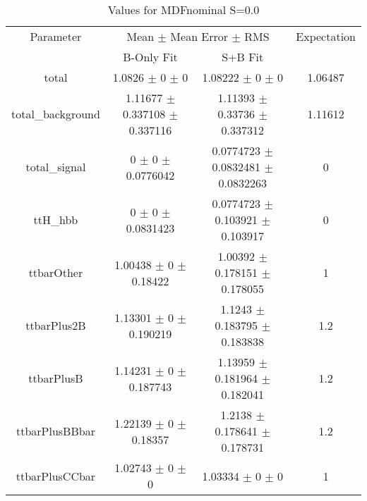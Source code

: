 \begin{table}
\centering
\caption{Values for MDFnominal S=0.0}
\begin{tabular}{cccc}
\toprule
Parameter & \multicolumn{2}{c}{Mean $\pm$ Mean Error $\pm$ RMS} & Expectation\\
 & B-Only Fit & S+B Fit & \\
\midrule
total & \num{1.0826} $\pm$ \num{0} $\pm$ \num{0} & \num{1.08222} $\pm$ \num{0} $\pm$ \num{0} & \num{1.06487}\\
total\_background & \num{1.11677} $\pm$ \num{0.337108} $\pm$ \num{0.337116} & \num{1.11393} $\pm$ \num{0.33736} $\pm$ \num{0.337312} & \num{1.11612}\\
total\_signal & \num{0} $\pm$ \num{0} $\pm$ \num{0.0776042} & \num{0.0774723} $\pm$ \num{0.0832481} $\pm$ \num{0.0832263} & \num{0}\\
ttH\_hbb & \num{0} $\pm$ \num{0} $\pm$ \num{0.0831423} & \num{0.0774723} $\pm$ \num{0.103921} $\pm$ \num{0.103917} & \num{0}\\
ttbarOther & \num{1.00438} $\pm$ \num{0} $\pm$ \num{0.18422} & \num{1.00392} $\pm$ \num{0.178151} $\pm$ \num{0.178055} & \num{1}\\
ttbarPlus2B & \num{1.13301} $\pm$ \num{0} $\pm$ \num{0.190219} & \num{1.1243} $\pm$ \num{0.183795} $\pm$ \num{0.183838} & \num{1.2}\\
ttbarPlusB & \num{1.14231} $\pm$ \num{0} $\pm$ \num{0.187743} & \num{1.13959} $\pm$ \num{0.181964} $\pm$ \num{0.182041} & \num{1.2}\\
ttbarPlusBBbar & \num{1.22139} $\pm$ \num{0} $\pm$ \num{0.18357} & \num{1.2138} $\pm$ \num{0.178641} $\pm$ \num{0.178731} & \num{1.2}\\
ttbarPlusCCbar & \num{1.02743} $\pm$ \num{0} $\pm$ \num{0} & \num{1.03334} $\pm$ \num{0} $\pm$ \num{0} & \num{1}\\
\bottomrule
\end{tabular}
\end{table}
